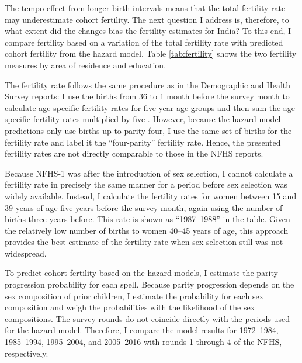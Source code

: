\documentclass[12pt,letterpaper]{article}
\begin{document}
The tempo effect from longer birth intervals means that the total fertility rate may 
underestimate cohort fertility. 
The next question I address is, therefore, to what extent did the changes bias the 
fertility estimates for India? 
To this end, I compare fertility based on a variation of the total fertility rate with 
predicted cohort fertility from the hazard model.
Table \ref{tab:fertility} shows the two fertility measures by area of residence and education.



The fertility rate follows the same procedure as in the Demographic and Health Survey 
reports: I use the births from 36 to 1 month before the survey month to calculate 
age-specific fertility rates for five-year age groups and then sum the age-specific 
fertility rates multiplied by five  \citep{Croft2018}.
However, because the hazard model predictions only use births up to parity four, I use the 
same set of births for the fertility rate and label it the ``four-parity'' fertility rate. 
Hence, the presented fertility rates are not directly comparable to those in the NFHS reports.

%

Because NFHS-1 was after the introduction of sex selection, I cannot calculate a fertility 
rate in precisely the same manner for a period before sex selection was widely available.
Instead, I calculate the fertility rates for women between 15 and 39 years of age five years 
before the survey month, again using the number of births three years before.
This rate is shown as ``1987--1988'' in the table.
Given the relatively low number of births to women 40--45 years of age, this approach 
provides the best estimate of the fertility rate when sex selection still was not 
widespread.

To predict cohort fertility based on the hazard models, I estimate the parity progression 
probability for each spell. 
Because parity progression depends on the sex composition of prior children, I estimate the 
probability for each sex composition and weigh the probabilities with the likelihood of 
the sex compositions.
The survey rounds do not coincide directly with the periods used for the hazard model.
Therefore, I compare the model results for 1972--1984, 1985--1994, 1995--2004,
and 2005--2016 with rounds 1 through 4 of the NFHS, respectively.
\end{document}
